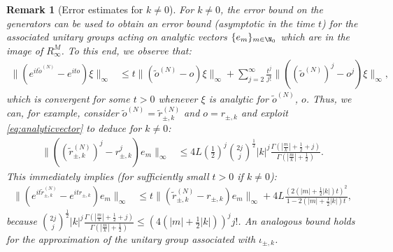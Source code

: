 \documentclass[a4paper, 11pt]{article}
\DeclareMathOperator{\1}{\mathds{1}}
\newtheorem{rem}[thm]{Remark}
\begin{document}
\begin{rem}[Error estimates for $k\neq0$]
\label{rem:conformalerror}
For $k\neq 0$, the error bound on the generators can be used to obtain an error bound (asymptotic in the time $t$) for the associated unitary groups acting on analytic vectors $\{e_{m}\}_{m\in\N_{0}}$ which are in the image of $R^{M}_{\infty}$. To this end, we observe that:
\begin{align*}
\|(e^{it\tilde{o}^{(N)}}-e^{ito})\xi\|_{\infty} & \leq t \|(\tilde{o}^{(N)}-o)\xi\|_{\infty}+\sum_{j=2}^{\infty}\tfrac{t^{j}}{j!}\|((\tilde{o}^{(N)})^{j}-o^{j})\xi\|_{\infty},
\end{align*}
which is convergent for some $t>0$ whenever $\xi$ is analytic for $\tilde{o}^{(N)}$, $o$. Thus, we can, for example, consider $\tilde{o}^{(N)}=\tilde{r}^{(N)}_{\pm,k}$ and $o = r_{\pm,k}$ and exploit \eqref{eq:analyticvector} to deduce for $k\neq0$:
\begin{align*}
\|((\tilde{r}^{(N)}_{\pm,k})^{j}-r_{\pm,k}^{j})e_{m}\|_{\infty} & \leq 4L(\tfrac{1}{2})^{j}\binom{2j}{j}^{\frac{1}{2}}|k|^{j}\tfrac{\Gamma(|\frac{m}{k}|+\frac{1}{2}+j)}{\Gamma(|\frac{m}{k}|+\frac{1}{2})}.
\end{align*}
This immediately implies (for sufficiently small $t>0$ if $k\neq 0$):
\begin{align}
\label{eq:conformalerror}
\|(e^{it\tilde{r}^{(N)}_{\pm,k}}-e^{itr_{\pm,k}})e_{m}\|_{\infty} & \leq t \|(\tilde{r}^{(N)}_{\pm,k}-r_{\pm,k})e_{m}\|_{\infty} + 4L\frac{(2(|m|+\frac{1}{2}|k|)t)^{2}}{1-2(|m|+\frac{1}{2}|k|)t} ,
\end{align}
because $\binom{2j}{j}^{\frac{1}{2}}|k|^{j}\tfrac{\Gamma(|\frac{m}{k}|+\frac{1}{2}+j)}{\Gamma(|\frac{m}{k}|+\frac{1}{2})} \leq (4(|m|+\tfrac{1}{2}|k|))^{j}j!$. An analogous bound holds for the approximation of the unitary group associated with $\iota_{\pm,k}$.


\end{rem}
\end{document}
